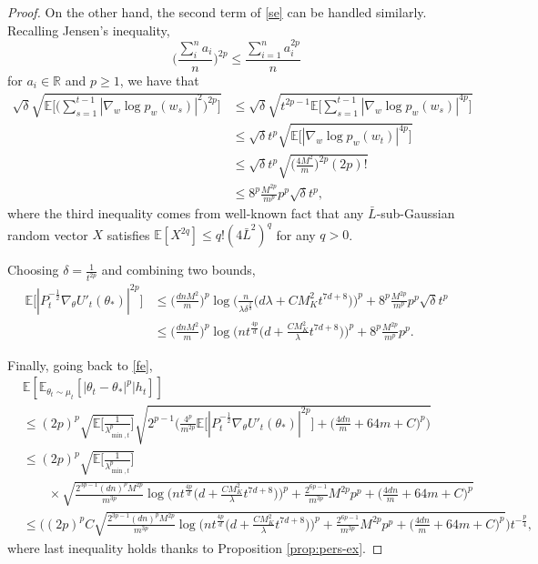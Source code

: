 \documentclass[11pt]{article}
\theoremstyle{plain}
\theoremstyle{definition}
\theoremstyle{remark}
\newcommand{\E}{\mathbb{E}}
\begin{document}
\begin{proof}
On the other hand, the second term of \eqref{se} can be handled similarly. Recalling Jensen's inequality,
\[
\bigg(\frac{\sum_{i}^n a_i}{n}\bigg )^{2p} \leq \frac{\sum_{i=1}^n a_i^{2p}}{n}
\]
for $a_i \in \mathbb{R}$ and $p \geq 1$, we have that
\begin{equation*}
\begin{split}
\sqrt{\delta}\sqrt{\mathbb{E}\bigg[\bigg(\sum_{s=1}^{t-1}|\nabla_w \log p_w(w_s)|^2\bigg)^{2p}\bigg]}&\leq \sqrt{\delta}\sqrt{t^{2p-1}\mathbb{E}\bigg[\sum_{s=1}^{t-1}|\nabla_w \log p_w(w_s)|^{4p}\bigg]}\\
&\leq \sqrt{\delta}t^{p}\sqrt{\mathbb{E}\bigg[|\nabla_w \log p_w(w_t)|^{4p}\bigg]}\\
&\leq \sqrt{\delta}t^{p}\sqrt{\bigg(\frac{4M^2}{m}\bigg)^{2p}(2p)!}\\
&\leq 8^p\frac{M^{2p}}{m^{p}}p^p\sqrt{\delta}t^{p},
\end{split}
\end{equation*}
where the third inequality comes from well-known fact that any $\bar L$-sub-Gaussian random vector $X$ satisfies $\E[X^{2q}] \leq q!(4{\bar L}^2)^q$ for any $q>0$.

Choosing $\delta = \frac{1}{t^{2p}}$ and combining two bounds,
\begin{align*}
    \mathbb{E}\bigg[|P_{t}^{-\frac{1}{2}}\nabla_{\theta} U'_{t}(\theta_*)|^{2p}\bigg]&\leq  \bigg(\frac{dnM^2}{m}\bigg)^p\log\bigg(\frac{n}{\lambda\delta^{\frac{2}{d}}}\bigg(d\lambda+CM_K^2{t}^{7d+8}\bigg)\bigg)^p+8^p\frac{M^{2p}}{m^{p}}p^p\sqrt{\delta}t^{p}\\
    &\leq\bigg(\frac{dnM^2}{m}\bigg)^p\log\bigg(nt^{\frac{4p}{d}}\bigg(d+\frac{CM_K^2}{\lambda}t^{7d+8}\bigg)\bigg)^p+8^p\frac{M^{2p}}{m^{p}}p^p.
\end{align*}

Finally, going back to \eqref{fe},
\begin{equation*}
\begin{split}
    &\mathbb{E}[\mathbb{E}_{\theta_t \sim \mu_{t}}[|\theta_t-\theta_*|^p|h_{t}]] \\
    & \leq (2p)^p \sqrt{\mathbb{E}\bigg[\frac{1}{\lambda_{\min,t}^{p}}\bigg]}\sqrt{2^{p-1}\bigg(\frac{4^p}{m^{2p}}\mathbb{E}\bigg[|P_{t}^{-\frac{1}{2}}\nabla_{\theta} U'_{t}(\theta_*)|^{2p}\bigg] + \bigg( \frac{4dn}{m}+ 64m+C\bigg)^p\bigg)}\\
    &\leq (2p)^p \sqrt{\mathbb{E}\bigg[\frac{1}{\lambda_{\min,t}^{p}}\bigg]}\\
    &\quad\quad \times\sqrt{\frac{2^{3p-1}(dn)^pM^{2p}}{m^{3p}}\log\bigg(nt^{\frac{4p}{d}}\bigg(d+\frac{CM_K^2}{\lambda}t^{7d+8}\bigg)\bigg)^p+ \frac{2^{6p-1}}{m^{3p}}M^{2p}p^p+\bigg( \frac{4dn}{m}+ 64m+C\bigg)^p}\\
    &\leq \bigg((2p)^pC\sqrt{\frac{2^{3p-1}(dn)^pM^{2p}}{m^{3p}}\log\bigg(nt^{\frac{4p}{d}}\bigg(d+\frac{CM_K^2}{\lambda}t^{7d+8}\bigg)\bigg)^p+ \frac{2^{6p-1}}{m^{3p}}M^{2p}p^p+\bigg( \frac{4dn}{m}+ 64m+C\bigg)^p}\bigg)t^{-\frac{p}{4}},
\end{split}
\end{equation*}
where last inequality holds thanks to Proposition \ref{prop:pers-ex}.


\end{proof}
\end{document}
